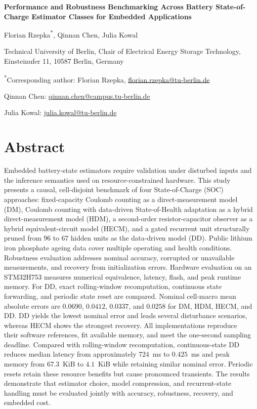 \documentclass[11pt,a4paper]{article}
\begin{document}
\begin{center}
{\LARGE\bfseries Performance and Robustness Benchmarking Across Battery State-of-Charge Estimator Classes for Embedded Applications\par}
\vspace{1.2em}
{\large Florian Rzepka\textsuperscript{*}, Qinnan Chen, Julia Kowal\par}
\vspace{0.6em}
Technical University of Berlin, Chair of Electrical Energy Storage Technology,\\
Einsteinufer 11, 10587 Berlin, Germany
\end{center}

\textsuperscript{*}Corresponding author: Florian Rzepka, \href{mailto:florian.rzepka@tu-berlin.de}{florian.rzepka@tu-berlin.de}

Qinnan Chen: \href{mailto:qinnan.chen@campus.tu-berlin.de}{qinnan.chen@campus.tu-berlin.de}

Julia Kowal: \href{mailto:julia.kowal@tu-berlin.de}{julia.kowal@tu-berlin.de}

\section*{Abstract}
Embedded battery-state estimators require validation under disturbed inputs and the inference semantics used on resource-constrained hardware. This study presents a causal, cell-disjoint benchmark of four State-of-Charge (SOC) approaches: fixed-capacity Coulomb counting as a direct-measurement model (DM), Coulomb counting with data-driven State-of-Health adaptation as a hybrid direct-measurement model (HDM), a second-order resistor-capacitor observer as a hybrid equivalent-circuit model (HECM), and a gated recurrent unit structurally pruned from $96$ to $67$ hidden units as the data-driven model (DD). Public lithium iron phosphate ageing data cover multiple operating and health conditions. Robustness evaluation addresses nominal accuracy, corrupted or unavailable measurements, and recovery from initialization errors. Hardware evaluation on an STM32H753 measures numerical equivalence, latency, flash, and peak runtime memory. For DD, exact rolling-window recomputation, continuous state forwarding, and periodic state reset are compared. Nominal cell-macro mean absolute errors are $0.0690$, $0.0412$, $0.0337$, and $0.0258$ for DM, HDM, HECM, and DD. DD yields the lowest nominal error and leads several disturbance scenarios, whereas HECM shows the strongest recovery. All implementations reproduce their software references, fit available memory, and meet the one-second sampling deadline. Compared with rolling-window recomputation, continuous-state DD reduces median latency from approximately $724$~ms to $0.425$~ms and peak memory from $67.3$~KiB to $4.1$~KiB while retaining similar nominal error. Periodic resets retain these resource benefits but cause pronounced transients. The results demonstrate that estimator choice, model compression, and recurrent-state handling must be evaluated jointly with accuracy, robustness, recovery, and embedded cost.
\end{document}

